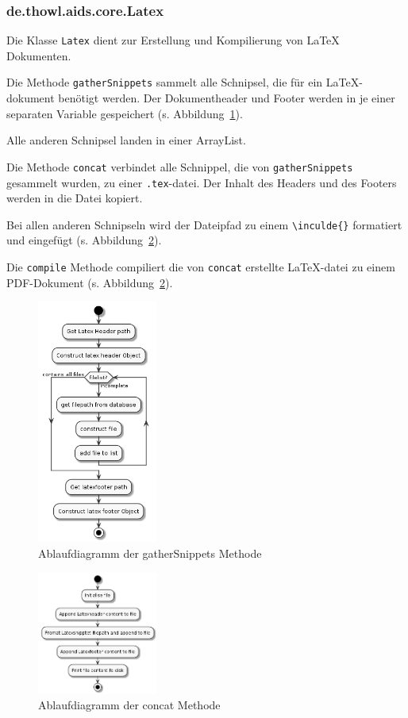 \documentclass[stu, a4paper, 11pt, floatsintext]{apa7}
\begin{document}
\subsubsection{de.thowl.aids.core.Latex}
\noindent  Die Klasse \texttt{Latex} dient zur Erstellung und Kompilierung von \LaTeX{} Dokumenten.

Die Methode \texttt{gatherSnippets} sammelt alle Schnipsel, die für ein \LaTeX{}-dokument benötigt werden.
Der Dokumentheader und Footer werden in je einer separaten Variable gespeichert (s. Abbildung~\ref{gatherSnippets-methode}).

Alle anderen Schnipsel landen in einer ArrayList.

Die Methode \texttt{concat} verbindet alle Schnippel, die von \texttt{gatherSnippets} gesammelt wurden, zu einer \texttt{.tex}-datei.
Der Inhalt des Headers und des Footers werden in die Datei kopiert.

Bei allen anderen Schnipseln wird der Dateipfad zu einem \texttt{\textbackslash{}inculde\{\}}
formatiert und eingefügt (s. Abbildung~\ref{concat-methode}).

Die \texttt{compile} Methode compiliert die von \texttt{concat} erstellte \LaTeX{}-datei zu einem PDF-Dokument (s. Abbildung~\ref{concat-methode}).

\begin{figure}[!htbp]
\centering
\includegraphics[width=150px]{../technical_documentation/diagramm/uml/flowcharts/core/latex/gatherSnippets.png}
\caption{\label{gatherSnippets-methode}Ablaufdiagramm der gatherSnippets Methode}
\end{figure}

\begin{figure}[!htbp]
\centering
\includegraphics[width=150px]{../technical_documentation/diagramm/uml/flowcharts/core/latex/concat.png}
\caption{\label{concat-methode}Ablaufdiagramm der concat Methode}
\end{figure}
\end{document}
